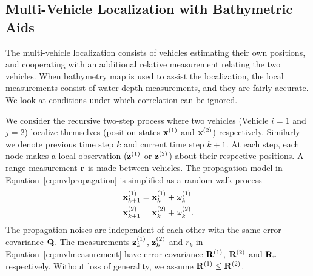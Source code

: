 



\subsection{Multi-Vehicle Localization with Bathymetric Aids}

The multi-vehicle localization consists of vehicles estimating their own positions, and cooperating with an additional relative measurement relating the two vehicles. When bathymetry map is used to assist the localization, the local measurements consist of water depth measurements, and they are fairly accurate. We look at conditions under which correlation can be ignored.

We consider the recursive two-step process where two vehicles (Vehicle $i=1$ and $j=2$) localize themselves (position states ${\bf x}^{(1)}$ and ${\bf x}^{(2)}$) respectively. Similarly we denote previous time step $k$ and current time step $k+1$. At each step, each node makes a local observation (${\bf z}^{(1)}$ or ${\bf z}^{(2)}$) about their respective positions. A range measurement ${\bf r}$ is made between vehicles. The propagation model in Equation~\eqref{eq:mvlpropagation} is simplified as a random walk process
\begin{equation}
\begin{split}
{\bf x}_{k+1}^{(1)}&={\bf x}_k^{(1)}+{\bf \omega}_k^{(1)}\\
{\bf x}_{k+1}^{(2)}&={\bf x}_k^{(2)}+{\bf \omega}_k^{(2)}.\\
\end{split}
\end{equation}
The propagation noises are independent of each other with the same error covariance ${\bf Q}$. The measurements ${\bf z}_k^{(1)}$, ${\bf z}_k^{(2)}$ and $r_k$ in Equation~\eqref{eq:mvlmeasurement} have error covariance ${\bf R}^{(1)}$, ${\bf R}^{(2)}$ and ${\bf R}_r$ respectively. Without loss of generality, we assume ${\bf R}^{(1)}\leq{\bf R}^{(2)}$.

